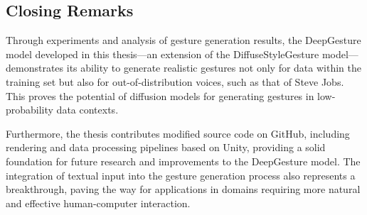 %	
%	
%	
%

\subsection{Closing Remarks}

Through experiments and analysis of gesture generation results, the DeepGesture model developed in this thesis—an extension of the DiffuseStyleGesture model—demonstrates its ability to generate realistic gestures not only for data within the training set but also for out-of-distribution voices, such as that of Steve Jobs. This proves the potential of diffusion models for generating gestures in low-probability data contexts.

Furthermore, the thesis contributes modified source code on GitHub, including rendering and data processing pipelines based on Unity, providing a solid foundation for future research and improvements to the DeepGesture model. The integration of textual input into the gesture generation process also represents a breakthrough, paving the way for applications in domains requiring more natural and effective human-computer interaction.